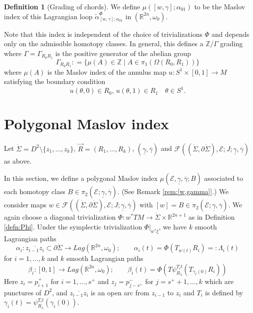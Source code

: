 \documentclass[reqno]{amsart}
\def\R{\ifmmode{\mathbb R}\else{$\mathbb R$}\fi} %
\def\Z{\ifmmode{\mathbb Z}\else{$\mathbb Z$}\fi} %
\newcommand{\del}{\partial}
\newcommand{\be}{\begin{equation}}
\newcommand{\ee}{\end{equation}}
\theoremstyle{theorem}
\theoremstyle{definition}
\newtheorem{defn}[thm]{Definition}
\numberwithin{equation}{section}
\def\R{{\mathbb R}}
\def\Z{{\mathbb Z}}
\def\R{{\mathbb R}}
\def\Z{\mathbb{Z}}
\def\R{\ifmmode{\mathbb R}\else{$\mathbb R$}\fi} %
\def\Z{\ifmmode{\mathbb Z}\else{$\mathbb Z$}\fi} %
\def\R{{\mathbb R}}
\def\Z{{\mathbb Z}}
\def\R{{\mathbb R}}
\begin{document}
\begin{defn}[Grading of chords]
We define $\mu([w,\gamma];\alpha_{01})$ to be the Maslov index of this Lagrangian loop $\widetilde{\alpha}^\Phi_{[w,\gamma];\alpha_{01}}$ in $(\R^{2n},\omega_0)$.
\end{defn}
Note that this index is independent of the choice of trivializations $\Phi$
and depends only on the admissible homotopy classes.
In general, this defines a $\Z/\Gamma$ grading where $\Gamma = \Gamma_{R_0R_1}$ is the positive generator of the
abelian group
\be\label{eq:Gamma}
\Gamma_{R_0R_1}: = \{ \mu(A) \in \Z \mid A \in \pi_1(\Omega(R_0,R_1))\}
\ee
where $\mu(A)$ is the Maslov index of the annulus map $u: S^1 \times [0,1] \to M$
satisfying the boundary condition
$$
u(\theta,0) \in R_0, \, u(\theta,1) \in R_1 \quad \theta \in S^1.
$$

\section{Polygonal Maslov index}
\label{sec:polygonal}

Let $\dot \Sigma = D^2 \setminus \{z_1,\ldots,z_k\}$, $\vec{R} = (R_1,\ldots,R_k)$, $(\underline \gamma,\overline \gamma)$ and $\mathcal{F}((\dot{\Sigma},\del \dot{\Sigma}), \mathcal{E}; J; \underline \gamma,\overline \gamma)$ as above.

In this section, we define a polygonal Maslov index $\mu(\mathcal{E},\underline \gamma,\overline \gamma;B)$ associated to each homotopy class $B\in\pi_2(\mathcal{E};\underline \gamma,\overline \gamma)$. (See Remark \ref{rem:[w,gamma]}.)
We consider maps $w\in \mathcal{F}((\dot{\Sigma},\del \dot{\Sigma}), \mathcal{E}; J; \underline \gamma,\overline \gamma)$ with $[w]=B\in\pi_2(\mathcal{E};\underline \gamma,\overline \gamma)$. We again choose a diagonal trivialization $\Phi:w^*TM \rightarrow \dot \Sigma\times\R^{2n+1}$ as in Definition \ref{defn:Phi}.
Under the symplectic trivialization $\Phi|_{w^*\xi}$, we have $k$ smooth Lagrangian paths
$$
\alpha_i:\overline{z_{i-1}z_i}\subset \partial\dot \Sigma \rightarrow Lag(\R^{2n},\omega_0);
\qquad \alpha_i(t) = \Phi(T_{w(t)}R_i) =: \Lambda_i(t)
$$
for $i=1,\ldots,k$ and $k$ smooth Lagrangian paths
$$ \beta_i:[0,1] \rightarrow Lag(\R^{2n},\omega_0); \qquad \beta_i(t) = \Phi(T\psi^{T_it}_{R_\lambda}(T_{\gamma_i(0)}R_i))$$
Here $z_i = p_{i+1}^+$ for $i=1,\ldots,s^+$ and $z_j = p_{j-s^+}^-$ for $j=s^++1,\ldots,k$ which are punctures of $D^2$, and $\overline{z_{i-1}z_i}$ is an open arc from $z_{i-1}$ to $z_i$ and $T_i$ is defined by $\gamma_i(t) = \psi^{T_it}_{R_\lambda}(\gamma_i(0))$.
\end{document}
